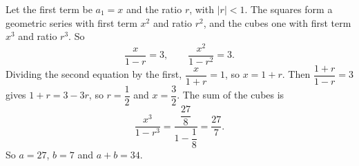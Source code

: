 Let the first term be $a_1=x$ and the ratio $r$, with $|r|<1$. The squares form a geometric series with first term $x^2$ and ratio $r^2$, and the cubes one with first term $x^3$ and ratio $r^3$. So
\[\dfrac{x}{1-r}=3,\qquad \dfrac{x^2}{1-r^2}=3.\]
Dividing the second equation by the first, $\dfrac{x}{1+r}=1$, so $x=1+r$. Then $\dfrac{1+r}{1-r}=3$ gives $1+r=3-3r$, so $r=\dfrac{1}{2}$ and $x=\dfrac{3}{2}$. The sum of the cubes is
\[\dfrac{x^3}{1-r^3}=\dfrac{\dfrac{27}{8}}{1-\dfrac{1}{8}}=\dfrac{27}{7}.\]
So $a=27$, $b=7$ and $a+b=\boxed{34}$.
